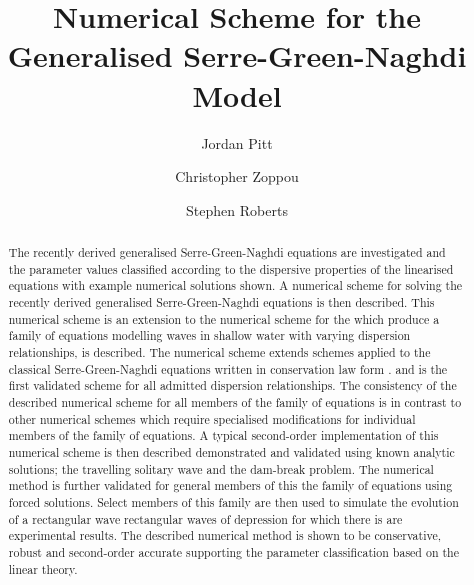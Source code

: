 \documentclass[10pt]{elsarticle}
\providecommand{\DIFaddtex}[1]{{\protect\color{blue} \sf #1}} %
\providecommand{\DIFdeltex}[1]{{\protect\color{red} \scriptsize #1}} %
\providecommand{\DIFaddbegin}{} %
\providecommand{\DIFaddend}{} %
\providecommand{\DIFdelbegin}{} %
\providecommand{\DIFdelend}{} %
\providecommand{\DIFadd}[1]{\texorpdfstring{\DIFaddtex{#1}}{#1}} %
\providecommand{\DIFdel}[1]{\texorpdfstring{\DIFdeltex{#1}}{}} %
\newcommand{\DIFscaledelfig}{0.5}
\newlength{\DIFdelgraphicswidth} %
\newlength{\DIFdelgraphicsheight} %
\newcommand{\DIFaddincludegraphics}[2][]{{\color{blue}\fbox{\DIFOincludegraphics[#1]{#2}}}} %
\newcommand{\DIFdelincludegraphics}[2][]{%
\sbox{\DIFdelgraphicsbox}{\DIFOincludegraphics[#1]{#2}}%
\settoboxwidth{\DIFdelgraphicswidth}{\DIFdelgraphicsbox} %
\settoboxtotalheight{\DIFdelgraphicsheight}{\DIFdelgraphicsbox} %
\scalebox{\DIFscaledelfig}{%
\parbox[b]{\DIFdelgraphicswidth}{\usebox{\DIFdelgraphicsbox}\\[-\baselineskip] \rule{\DIFdelgraphicswidth}{0em}}\llap{\resizebox{\DIFdelgraphicswidth}{\DIFdelgraphicsheight}{%
\setlength{\unitlength}{\DIFdelgraphicswidth}%
\begin{picture}(1,1)%
\thicklines\linethickness{2pt} %
{\color[rgb]{1,0,0}\put(0,0){\framebox(1,1){}}}%
{\color[rgb]{1,0,0}\put(0,0){\line( 1,1){1}}}%
{\color[rgb]{1,0,0}\put(0,1){\line(1,-1){1}}}%
\end{picture}%
}\hspace*{3pt}}} %
} %
\DeclareRobustCommand{\DIFaddbegin}{\DIFOaddbegin \let\includegraphics\DIFaddincludegraphics} %
\DeclareRobustCommand{\DIFaddend}{\DIFOaddend \let\includegraphics\DIFOincludegraphics} %
\DeclareRobustCommand{\DIFdelbegin}{\DIFOdelbegin \let\includegraphics\DIFdelincludegraphics} %
\DeclareRobustCommand{\DIFdelend}{\DIFOaddend \let\includegraphics\DIFOincludegraphics} %
\begin{document}

\begin{frontmatter}

\title{Numerical Scheme for the Generalised Serre-Green-Naghdi Model}
\author[label1]{Jordan Pitt}
\author[label1]{Christopher Zoppou}
\author[label1]{Stephen Roberts}
\address[label1]{Australian National University, Canberra}

\begin{abstract}
\DIFdelbegin \DIFdel{The recently derived generalised Serre-Green-Naghdi equations are investigated and the parameter values classified according to the dispersive properties of the linearised equations with example numerical solutions shown. }\DIFdelend A numerical scheme for solving the \DIFaddbegin \DIFadd{recently derived }\DIFaddend generalised Serre-Green-Naghdi equations \DIFdelbegin \DIFdel{is then described. This numerical scheme is an extension to the numerical scheme for the }\DIFdelend \DIFaddbegin \DIFadd{which produce a family of equations modelling waves in shallow water with varying dispersion relationships, is described. The numerical scheme extends schemes applied to the }\DIFaddend classical Serre-Green-Naghdi equations written in conservation law form \DIFdelbegin \DIFdel{. }\DIFdelend \DIFaddbegin \DIFadd{and is the first validated scheme for all admitted dispersion relationships. The consistency of the described numerical scheme for all members of the family of equations is in contrast to other numerical schemes which require specialised modifications for individual members of the family of equations. }\DIFaddend A typical second-order implementation of this numerical scheme is then \DIFdelbegin \DIFdel{described }\DIFdelend \DIFaddbegin \DIFadd{demonstrated }\DIFaddend and validated using known analytic solutions; the travelling solitary wave and the dam-break problem. The numerical method is further validated for general members of \DIFdelbegin \DIFdel{this }\DIFdelend \DIFaddbegin \DIFadd{the }\DIFaddend family of equations using forced solutions. Select members of this family are then used to simulate the evolution of \DIFdelbegin \DIFdel{a rectangular wave }\DIFdelend \DIFaddbegin \DIFadd{rectangular waves }\DIFaddend of depression for which there \DIFdelbegin \DIFdel{is }\DIFdelend \DIFaddbegin \DIFadd{are }\DIFaddend experimental results. The \DIFdelbegin \DIFdel{described }\DIFdelend numerical method is shown to be conservative, robust and second-order accurate \DIFdelbegin \DIFdel{supporting the parameter classification based on the linear theory.
}%


\end{abstract}
\end{frontmatter}
\end{document}
